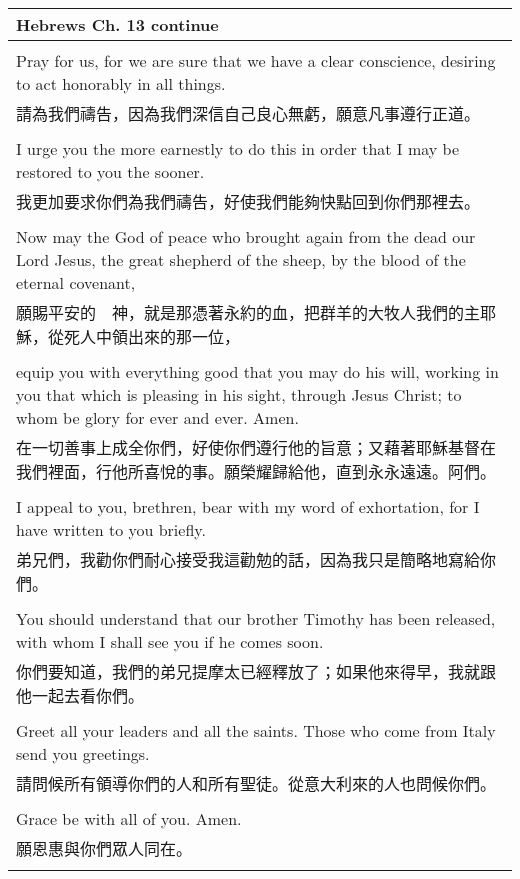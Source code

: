 \newpage

\begin{tabularx}{\textwidth}{p{}}
\hline
Hebrews Ch. 13 continue \\
\hline \\
Pray for us, for we are sure that we have a clear conscience, desiring to act honorably in all things. \\
請為我們禱告，因為我們深信自己良心無虧，願意凡事遵行正道。 \\ \\
I urge you the more earnestly to do this in order that I may be restored to you the sooner. \\
我更加要求你們為我們禱告，好使我們能夠快點回到你們那裡去。 \\ \\
Now may the God of peace who brought again from the dead our Lord Jesus, the great shepherd of the sheep, by the blood of the eternal covenant, \\
願賜平安的　神，就是那憑著永約的血，把群羊的大牧人我們的主耶穌，從死人中領出來的那一位， \\ \\
equip you with everything good that you may do his will, working in you that which is pleasing in his sight, through Jesus Christ; to whom be glory for ever and ever. Amen. \\
在一切善事上成全你們，好使你們遵行他的旨意；又藉著耶穌基督在我們裡面，行他所喜悅的事。願榮耀歸給他，直到永永遠遠。阿們。 \\ \\
I appeal to you, brethren, bear with my word of exhortation, for I have written to you briefly. \\
弟兄們，我勸你們耐心接受我這勸勉的話，因為我只是簡略地寫給你們。 \\ \\
You should understand that our brother Timothy has been released, with whom I shall see you if he comes soon. \\
你們要知道，我們的弟兄提摩太已經釋放了；如果他來得早，我就跟他一起去看你們。 \\ \\
Greet all your leaders and all the saints. Those who come from Italy send you greetings. \\
請問候所有領導你們的人和所有聖徒。從意大利來的人也問候你們。 \\ \\
Grace be with all of you. Amen. \\
願恩惠與你們眾人同在。 \\ \\

\hline
\end{tabularx}

